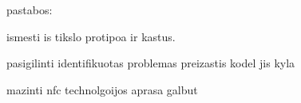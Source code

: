 














pastabos:

ismesti is tikslo protipoa ir kastus.



pasigilinti identifikuotas problemas
preizastis kodel jis kyla


mazinti nfc technolgoijos aprasa galbut






